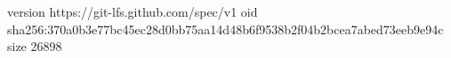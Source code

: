 version https://git-lfs.github.com/spec/v1
oid sha256:370a0b3e77bc45ec28d0bb75aa14d48b6f9538b2f04b2bcea7abed73eeb9e94c
size 26898
